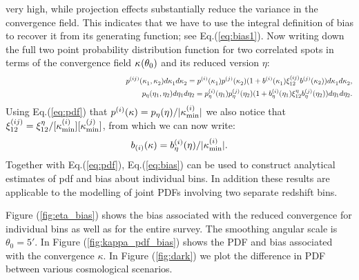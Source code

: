 \documentclass[usenatbib]{mn2e}
\def\n{\noindent}
\def\be{\begin{equation}}
\def\ee{\end{equation}}
\def\ben{\begin{eqnarray}}
\def\een{\end{eqnarray}}
\def\be{\begin{equation}}
\def\ee{\end{equation}}
\def\ben{\begin{eqnarray}}
\def\een{\end{eqnarray}}
\begin{document}
very high, while projection effects substantially reduce the variance in the convergence field.
This indicates that we have to use
the integral definition of bias to recover it from its generating
function; see Eq.(\ref{eq:bias1}). 
Now writing down the full two point probability distribution function 
for two correlated spots in terms of the convergence field $\kappa_{\rm  }(\theta_0)$ and
its reduced version $\eta$:
%
\ben
\quad\quad\quad\quad\quad\quad\quad\quad\quad\quad\quad\quad\quad\quad\quad\quad p^{(ij)}(\kappa^{\rm  }_1,\kappa^{\rm  }_2)d\kappa^{\rm  }_1 d\kappa^{\rm  }_2 = p^{(i)}(\kappa^{\rm  }_1) p^{(j)}(\kappa^{\rm  }_2)( 1
+ b^{(i)}(\kappa^{\rm  }_1) \xi^{(ij)}_{12} b^{(j)}(\kappa_2)) d\kappa^{\rm  }_1 d\kappa^{\rm  }_2, \\ 
\quad\quad\quad\quad\quad\quad p_{\eta}(\eta_1, \eta_2)d\eta_1 d\eta_2 = p^{(i)}_{\eta}(\eta_1) p^{(j)}_{\eta}(\eta_2)( 1
+ b^{(i)}_{\eta}(\eta_1) \xi^{\eta}_{12} b^{(j)}_{\eta}(\eta_2)) d\eta_1 d\eta_2. 
\een
%
\n
Using Eq.(\ref{eq:pdf}) that $p^{(i)}(\kappa)
= {p_{\eta}(\eta)/{|\kappa^{(i)}_{\rm min}}|}$ we also notice that $\xi^{(ij)}_{12} = 
{\xi^{\eta}_{12}/{[\kappa^{(i)}_{\rm min}]}{[\kappa^{(j)}_{\rm min}]}}$,
from which we can now write: 
\be
b_{(i)}(\kappa) = {b^{(i)}_{\eta}(\eta)/|{\kappa^{(i)}_{\rm min}}|}.
\label{eq:bias}
\ee
Together with Eq.(\ref{eq:pdf}), Eq.(\ref{eq:bias}) can be used to construct analytical estimates
of pdf and bias about individual bins. In addition these results are applicable to the modelling
of joint PDFs involving two separate redshift bins. 

Figure (\ref{fig:eta_bias}) shows the bias associated with the reduced convergence for individual bins
as well as for the entire survey. The smoothing angular scale is $\theta_0=5'$. In Figure (\ref{fig:kappa_pdf_bias})
shows the PDF and bias associated with the convergence $\kappa$. In Figure (\ref{fig:dark}) we plot the
difference in PDF between various cosmological scenarios. 
%
\end{document}
